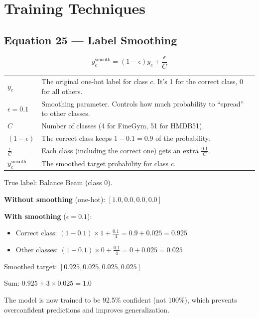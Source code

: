 \documentclass[12pt, a4paper]{article}
\begin{document}
\newpage
\section{Training Techniques}

\subsection{Equation 25 --- Label Smoothing}

\begin{eqbox}
\[
y_c^{\text{smooth}} = (1 - \epsilon) y_c + \frac{\epsilon}{C}
\]
\end{eqbox}

\begin{explainbox}
\begin{tabular}{lp{11cm}}
$y_c$ & The original one-hot label for class $c$. It's 1 for the correct class, 0 for all others.\\[0.2cm]
$\epsilon = 0.1$ & Smoothing parameter. Controls how much probability to ``spread'' to other classes.\\[0.2cm]
$C$ & Number of classes (4 for FineGym, 51 for HMDB51).\\[0.2cm]
$(1-\epsilon)$ & The correct class keeps $1 - 0.1 = 0.9$ of the probability.\\[0.2cm]
$\frac{\epsilon}{C}$ & Each class (including the correct one) gets an extra $\frac{0.1}{C}$.\\[0.2cm]
$y_c^{\text{smooth}}$ & The smoothed target probability for class $c$.
\end{tabular}
\end{explainbox}

\begin{examplebox}[Numerical Example: FineGym (C=4)]
True label: Balance Beam (class 0).

\textbf{Without smoothing} (one-hot): $[1.0, 0.0, 0.0, 0.0]$

\textbf{With smoothing} ($\epsilon = 0.1$):
\begin{itemize}
    \item Correct class: $(1 - 0.1) \times 1 + \frac{0.1}{4} = 0.9 + 0.025 = 0.925$
    \item Other classes: $(1 - 0.1) \times 0 + \frac{0.1}{4} = 0 + 0.025 = 0.025$
\end{itemize}
Smoothed target: $[0.925, 0.025, 0.025, 0.025]$

Sum: $0.925 + 3 \times 0.025 = 1.0$ \checkmark

The model is now trained to be 92.5\% confident (not 100\%), which prevents overconfident predictions and improves generalization.
\end{examplebox}
\end{document}
